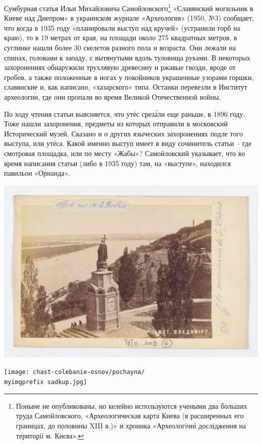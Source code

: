 Сумбурная статья Ильи Михайловича Самойловского\footnote{Поныне не опубликованы, но келейно используются учеными два больших труда Самойловского, «Археологическая карта Киева (в расширенных его границах, до половины XIII в.)» и хроника «Археологічні дослідження на території м. Києва».} «Славянский могильник в Киеве над Днепром» в украинском журнале «Археология» (1950, №3) сообщает, что когда в 1935 году «планировали выступ над кручей» (устранили горб на краю), то в 19 метрах от края, на площади около 275 квадратных метров, в суглинке нашли более 30 скелетов разного пола и возраста. Они лежали на спинах, головами к западу, с вытянутыми вдоль туловища руками. В некоторых захоронениях обнаружили трухлявую древесину и ржавые гвозди, вроде от гробов, а также положенные в ногах у покойников украшенные узорами горшки, славянские и, как написано, «хазарского» типа. Останки перевезли в Институт археологии, где они пропали во время Великой Отечественной войны.

По ходу чтения статьи выясняется, что утёс срез\'али еще раньше, в 1896 году. Тоже нашли захоронения, предметы из которых отправили в московский Исторический музей. Сказано и о других языческих захоронениях подле того выступа, или утёса. Какой именно выступ имеет в виду сочинитель статьи – где смотровая площадка, или по месту «Жабы»? Самойловский указывает, что во время написания статьи (либо в 1935 году) там, на «выступе», находился павильон «Орианда».

\begin{center}
\includegraphics[width=0.94\linewidth]{chast-colebanie-osnov/pochayna/kupsob.jpg}
\end{center}

\begin{center}
\texttt{[image: chast-colebanie-osnov/pochayna/\\myimgprefix sadkup.jpg]}
\end{center}

